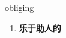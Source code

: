 
\begin{frame}
{\huge obliging}
\begin{center}
\begin{enumerate}\Large
  \item \textbf{乐于助人的}
\end{enumerate}
\end{center}
\end{frame}
